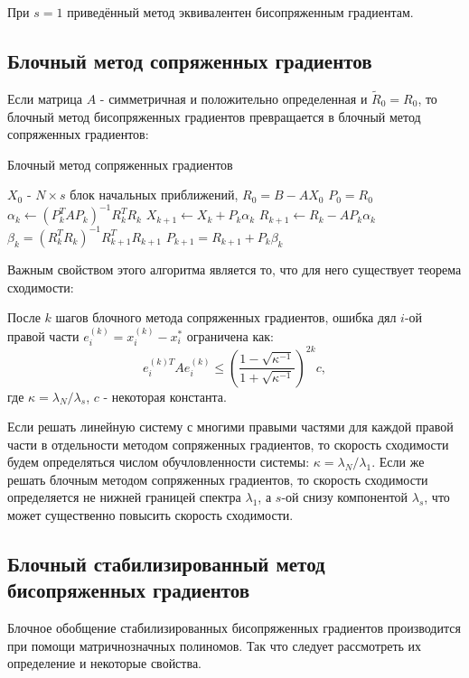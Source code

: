 При $s=1$ приведённый метод эквивалентен бисопряженным градиентам. 

\subsection[Блочный метод сопряженных градиентов]{Блочный метод сопряженных градиентов \cite{OLEARY1980293}}
Если матрица $A$ - симметричная и положительно определенная и $\tilde{R}_0 = R_0$, 
то блочный метод бисопряженных градиентов превращается в блочный метод сопряженных градиентов:
\begin{algorithm}[H]   
    \caption{Блочный метод сопряженных градиентов}
    \begin{algorithmic}
        \State $X_0$ - $N \times s$ блок начальных приближений, $R_0 = B - AX_0$
        \State $P_0 = R_0$
            \State $\alpha_k \gets (P_k^T A P_k)^{-1} R_k^T R_k$
            \State $X_{k+1} \gets X_k + P_k \alpha_k$
            \State $R_{k+1} \gets R_k - A P_k \alpha_k$
            \State $\beta_k = (R_k^T R_k)^{-1} R_{k+1}^T R_{k+1}$
            \State $P_{k+1} = R_{k+1} + P_k \beta_k$
        \EndFor 
    \end{algorithmic}
\end{algorithm}
Важным свойством этого алгоритма является то, что для него существует теорема сходимости:
\begin{theorem}
    После  $k$ шагов блочного метода сопряженных градиентов, ошибка дял $i$-ой правой части $e^{(k)}_i = x_i^{(k)} - x_i^*$ ограничена как:
    \begin{equation}
        e^{(k)T}_i A e^{(k)}_i \leq \left( \frac{1 - \sqrt{\kappa^{-1}}}{1 + \sqrt{\kappa^{-1}}} \right)^{2k} c, 
    \end{equation}
    где $\kappa = \lambda_N/\lambda_s$, $c$ - некоторая константа.
\end{theorem}
Если решать линейную систему с многими правыми частями для каждой правой части в отдельности
методом сопряженных градиентов, то скорость сходимости будем определяться числом
обучловленности системы: $\kappa = \lambda_N / \lambda_1$. Если же решать блочным методом
сопряженных градиентов, то скорость сходимости определяется не нижней границей спектра $\lambda_1$,
а $s$-ой снизу компонентой $\lambda_s$, что может существенно повысить скорость сходимости. 

\subsection[Блочный стабилизированный метод бисопряженных градиентов]{Блочный стабилизированный метод бисопряженных градиентов \cite{elGuennouni2003}}
Блочное обобщение стабилизированных бисопряженных градиентов производится при помощи
 матричнозначных полиномов. Так что следует рассмотреть их определение и некоторые свойства. 
